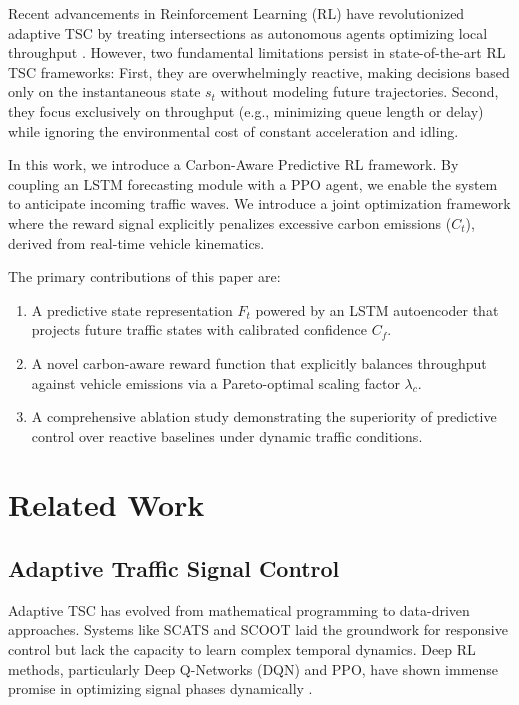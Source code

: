 \documentclass{ieeeaccess}
\begin{document}
Recent advancements in Reinforcement Learning (RL) have revolutionized adaptive TSC by treating intersections as autonomous agents optimizing local throughput \cite{placeholder3}. However, two fundamental limitations persist in state-of-the-art RL TSC frameworks: First, they are overwhelmingly reactive, making decisions based only on the instantaneous state $s_t$ without modeling future trajectories. Second, they focus exclusively on throughput (e.g., minimizing queue length or delay) while ignoring the environmental cost of constant acceleration and idling.

In this work, we introduce a Carbon-Aware Predictive RL framework. By coupling an LSTM forecasting module with a PPO agent, we enable the system to anticipate incoming traffic waves. We introduce a joint optimization framework where the reward signal explicitly penalizes excessive carbon emissions ($C_t$), derived from real-time vehicle kinematics. 

The primary contributions of this paper are:
\begin{enumerate}
    \item A predictive state representation $F_t$ powered by an LSTM autoencoder that projects future traffic states with calibrated confidence $C_f$.
    \item A novel carbon-aware reward function that explicitly balances throughput against vehicle emissions via a Pareto-optimal scaling factor $\lambda_c$.
    \item A comprehensive ablation study demonstrating the superiority of predictive control over reactive baselines under dynamic traffic conditions.
\end{enumerate}

\section{Related Work}
\label{sec:related_work}
\subsection{Adaptive Traffic Signal Control}
Adaptive TSC has evolved from mathematical programming to data-driven approaches. Systems like SCATS and SCOOT \cite{placeholder4} laid the groundwork for responsive control but lack the capacity to learn complex temporal dynamics. Deep RL methods, particularly Deep Q-Networks (DQN) and PPO, have shown immense promise in optimizing signal phases dynamically \cite{placeholder5}.
\end{document}
